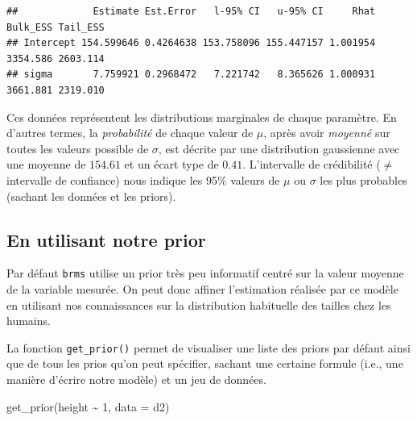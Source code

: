\documentclass[
  a4paper,11pt,twoside,onecolumn,openright,final,oldfontcommands]{memoir}
\newenvironment{Shaded}{\begin{snugshade}}{\end{snugshade}}
\newcommand{\AttributeTok}[1]{\textcolor[rgb]{0.77,0.63,0.00}{#1}}
\newcommand{\DecValTok}[1]{\textcolor[rgb]{0.00,0.00,0.81}{#1}}
\newcommand{\FunctionTok}[1]{\textcolor[rgb]{0.00,0.00,0.00}{#1}}
\newcommand{\NormalTok}[1]{#1}
\newcommand{\SpecialCharTok}[1]{\textcolor[rgb]{0.00,0.00,0.00}{#1}}
\theoremstyle{definition}
\theoremstyle{definition}
\theoremstyle{definition}
\theoremstyle{definition}
\theoremstyle{remark}
\begin{document}
\begin{Shaded}
\end{Shaded}

\begin{verbatim}
##             Estimate Est.Error   l-95% CI   u-95% CI     Rhat Bulk_ESS Tail_ESS
## Intercept 154.599646 0.4264638 153.758096 155.447157 1.001954 3354.586 2603.114
## sigma       7.759921 0.2968472   7.221742   8.365626 1.000931 3661.881 2319.010
\end{verbatim}

Ces données représentent les distributions marginales de chaque paramètre. En d'autres termes, la \emph{probabilité} de chaque valeur de \(\mu\), après avoir \emph{moyenné} sur toutes les valeurs possible de \(\sigma\), est décrite par une distribution gaussienne avec une moyenne de \(154.61\) et un écart type de \(0.41\). L'intervalle de crédibilité (\(\neq\) intervalle de confiance) nous indique les 95\% valeurs de \(\mu\) ou \(\sigma\) les plus probables (sachant les données et les priors).

\hypertarget{en-utilisant-notre-prior}{%
\subsection{En utilisant notre prior}\label{en-utilisant-notre-prior}}

Par défaut \texttt{brms} utilise un prior très peu informatif centré sur la valeur moyenne de la variable mesurée. On peut donc affiner l'estimation réalisée par ce modèle en utilisant nos connaissances sur la distribution habituelle des tailles chez les humains.

La fonction \texttt{get\_prior()} permet de visualiser une liste des priors par défaut ainsi que de tous les prios qu'on peut spécifier, sachant une certaine formule (i.e., une manière d'écrire notre modèle) et un jeu de données.

\begin{Shaded}
\begin{Highlighting}[]
\FunctionTok{get\_prior}\NormalTok{(height }\SpecialCharTok{\textasciitilde{}} \DecValTok{1}\NormalTok{, }\AttributeTok{data =}\NormalTok{ d2)}
\end{Highlighting}
\end{Shaded}
\end{document}
